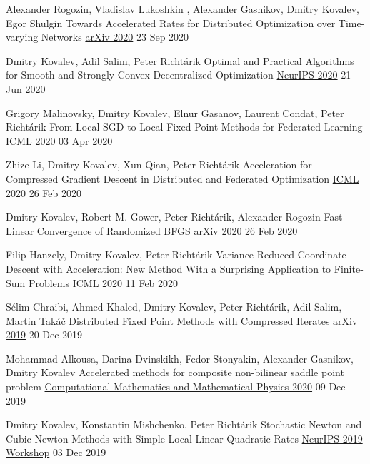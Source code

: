 \begin{cventries}
\cventry
{Alexander Rogozin, Vladislav Lukoshkin , Alexander Gasnikov, Dmitry Kovalev, Egor Shulgin} %
{Towards Accelerated Rates for Distributed Optimization over Time-varying Networks} %
{\href{https://arxiv.org/abs/2009.11069}{arXiv 2020}} 
{23 Sep 2020} %
{}	

\cventry
{Dmitry Kovalev, Adil Salim, Peter Richtárik} %
{Optimal and Practical Algorithms for Smooth and Strongly Convex Decentralized Optimization} %
{\href{https://papers.nips.cc/paper/2020/hash/d530d454337fb09964237fecb4bea6ce-Abstract.html}{NeurIPS 2020}} 
{21 Jun 2020} %
{}	

\cventry
{Grigory Malinovsky, Dmitry Kovalev, Elnur Gasanov, Laurent Condat, Peter Richtárik} %
{From Local SGD to Local Fixed Point Methods for Federated Learning} %
{\href{http://proceedings.mlr.press/v119/malinovskiy20a.html}{ICML 2020}} 
{03 Apr 2020} %
{}	

\cventry
{Zhize Li, Dmitry Kovalev, Xun Qian, Peter Richtárik} %
{Acceleration for Compressed Gradient Descent in Distributed and Federated Optimization} %
{\href{http://proceedings.mlr.press/v119/li20g.html}{ICML 2020}} 
{26 Feb 2020} %
{}	

\cventry
{Dmitry Kovalev, Robert M. Gower, Peter Richtárik, Alexander Rogozin} %
{Fast Linear Convergence of Randomized BFGS} %
{\href{https://arxiv.org/abs/2002.11337}{arXiv 2020}} 
{26 Feb 2020} %
{}	

\cventry
{Filip Hanzely, Dmitry Kovalev, Peter Richtárik} %
{Variance Reduced Coordinate Descent with Acceleration: New Method With a Surprising Application to Finite-Sum Problems} %
{\href{http://proceedings.mlr.press/v119/hanzely20b.html}{ICML 2020}} 
{11 Feb 2020} %
{}	

\cventry
{Sélim Chraibi, Ahmed Khaled, Dmitry Kovalev, Peter Richtárik, Adil Salim, Martin Takáč} %
{Distributed Fixed Point Methods with Compressed Iterates} %
{\href{https://arxiv.org/abs/1912.09925}{arXiv 2019}} 
{20 Dec 2019} %
{}	

\cventry
{Mohammad Alkousa, Darina Dvinskikh, Fedor Stonyakin, Alexander Gasnikov, Dmitry Kovalev} %
{Accelerated methods for composite non-bilinear saddle point problem} %
{\href{https://link.springer.com/article/10.1134/S0965542520110020}{Computational Mathematics and Mathematical Physics 2020}} 
{09 Dec 2019} %
{}	

\cventry
{Dmitry Kovalev, Konstantin Mishchenko, Peter Richtárik} %
{Stochastic Newton and Cubic Newton Methods with Simple Local Linear-Quadratic Rates} %
{\href{https://sites.google.com/site/optneurips19/}{NeurIPS 2019 Workshop}} 
{03 Dec 2019} %
{}	


\end{cventries}
